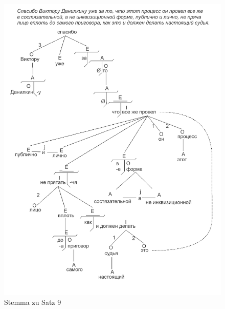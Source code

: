 \begin{figure}
    \begin{center}
        \includegraphics{anhang_a/stemma9}
        \caption{Stemma zu Satz 9}
        \label{fig:stemma9}
    \end{center}
\end{figure}

